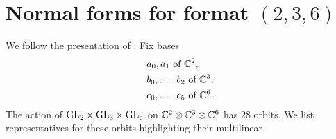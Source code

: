 \section{Normal forms for format $(2,3,6)$}
\label{RepTheory-orbitclassification-section-236}

We follow the presentation of \cite[Sec. 10.3]{Lan12}. Fix bases 
\begin{align*}
&a_0,a_1 \text { of } \mathbb{C}^2, \\
&b_0, \ldots , b_2 \text{ of } \mathbb{C}^3, \\ 
&c_0, \ldots , c_5 \text{ of } \mathbb{C}^6. \\ 
\end{align*}
The action of $\mathrm{GL}_2 \times \mathrm{GL}_3 \times \mathrm{GL}_6$ on $\mathbb{C}^2 \otimes \mathbb{C}^3 \otimes \mathbb{C}^6$ has $28$ orbits. We list representatives for these orbits highlighting their multilinear. 

